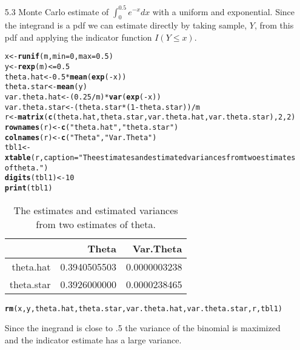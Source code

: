 \documentclass{article}\usepackage[]{graphicx}\usepackage[]{color}
\makeatletter
\newcommand{\hlstr}[1]{\textcolor[rgb]{0.192,0.494,0.8}{#1}}%
\newcommand{\hlkwd}[1]{\textcolor[rgb]{0.737,0.353,0.396}{\textbf{#1}}}%
\newenvironment{kframe}{%
 \def\at@end@of@kframe{}%
 \ifinner\ifhmode%
  \def\at@end@of@kframe{\end{minipage}}%
  \begin{minipage}{\columnwidth}%
 \fi\fi%
 \def\FrameCommand##1{\hskip\@totalleftmargin \hskip-\fboxsep
 \colorbox{shadecolor}{##1}\hskip-\fboxsep
     \hskip-\linewidth \hskip-\@totalleftmargin \hskip\columnwidth}%
 \MakeFramed {\advance\hsize-\width
   \@totalleftmargin\z@ \linewidth\hsize
   \@setminipage}}%
 {\par\unskip\endMakeFramed%
 \at@end@of@kframe}
\makeatother
\begin{document}
\begin{itemize}
\item[5.3] Monte Carlo estimate of $\int_0^{0.5} e^{-x}dx$ with a uniform and exponential.  Since the integrand is a pdf we can estimate directly by taking sample, $Y$, from this pdf and applying the indicator function $I(Y \leq x)$.\\
\begin{kframe}
\begin{alltt}
x <- \hlkwd{runif}(m, min = 0, max = 0.5)
y <- \hlkwd{rexp}(m) <= 0.5
theta.hat <- 0.5 * \hlkwd{mean}(\hlkwd{exp}(-x))
theta.star <- \hlkwd{mean}(y)
var.theta.hat <- (0.25/m) * \hlkwd{var}(\hlkwd{exp}(-x))
var.theta.star <- (theta.star * (1 - theta.star))/m
r <- \hlkwd{matrix}(\hlkwd{c}(theta.hat, theta.star, var.theta.hat, var.theta.star), 2, 2)
\hlkwd{rownames}(r) <- \hlkwd{c}(\hlstr{"theta.hat"}, \hlstr{"theta.star"})
\hlkwd{colnames}(r) <- \hlkwd{c}(\hlstr{"Theta"}, \hlstr{"Var.Theta"})
tbl1 <- \hlkwd{xtable}(r, caption = \hlstr{"The estimates and estimated variances from two estimates of theta."})
\hlkwd{digits}(tbl1) <- 10
\hlkwd{print}(tbl1)
\end{alltt}
\end{kframe}%
\begin{table}[ht]
\centering
\begin{tabular}{rrr}
  \hline
 & Theta & Var.Theta \\ 
  \hline
theta.hat & 0.3940505503 & 0.0000003238 \\ 
  theta.star & 0.3926000000 & 0.0000238465 \\ 
   \hline
\end{tabular}
\caption{The estimates and estimated variances from two estimates of theta.} 
\end{table}
\begin{kframe}\begin{alltt}
\hlkwd{rm}(x, y, theta.hat, theta.star, var.theta.hat, var.theta.star, r, tbl1)
\end{alltt}
\end{kframe}

Since the inegrand is close to .5 the variance of the binomial is maximized and the indicator estimate has a large variance.


\end{itemize}
\end{document}
